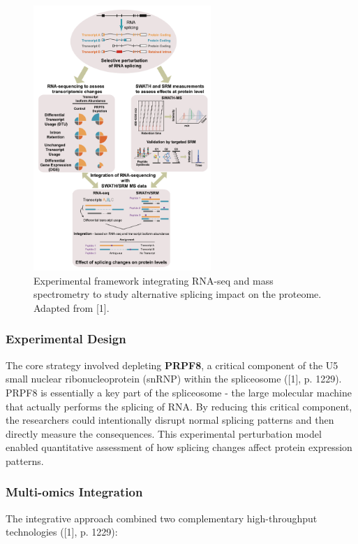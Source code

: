 \documentclass[12pt,a4paper]{article}
\begin{document}
\begin{figure}[H]
\centering
\includegraphics[width=0.6\textwidth]{images/framework_figure_1_liu.png}
\caption{Experimental framework integrating RNA-seq and mass spectrometry to study alternative splicing impact on the proteome. Adapted from [1].}
\label{fig:experimental_framework}
\end{figure}

\subsubsection{Experimental Design}

The core strategy involved depleting \textbf{PRPF8}, a critical component of the U5 small nuclear ribonucleoprotein (snRNP) within the spliceosome ([1], p. 1229). PRPF8 is essentially a key part of the spliceosome - the large molecular machine that actually performs the splicing of RNA. By reducing this critical component, the researchers could intentionally disrupt normal splicing patterns and then directly measure the consequences. This experimental perturbation model enabled quantitative assessment of how splicing changes affect protein expression patterns.

\subsubsection{Multi-omics Integration}

The integrative approach combined two complementary high-throughput technologies ([1], p. 1229):
\end{document}
